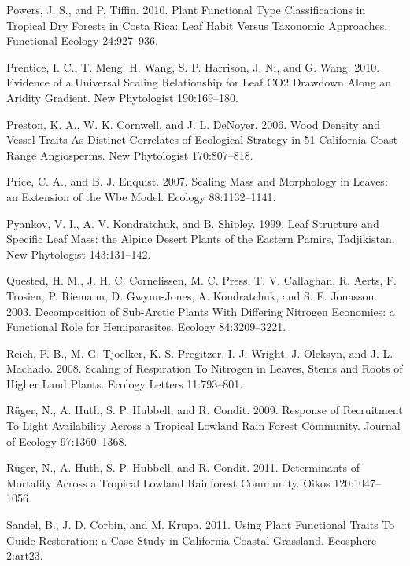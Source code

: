 \documentclass[11pt]{article}
\begin{document}
\begin{hangparas}{1.5em}{1}
\hypertarget{citeproc_bib_item_91}{Powers, J. S., and P. Tiffin. 2010. Plant Functional Type Classifications in Tropical Dry Forests in Costa Rica: Leaf Habit Versus Taxonomic Approaches. Functional Ecology 24:927–936.}

\hypertarget{citeproc_bib_item_92}{Prentice, I. C., T. Meng, H. Wang, S. P. Harrison, J. Ni, and G. Wang. 2010. Evidence of a Universal Scaling Relationship for Leaf CO2 Drawdown Along an Aridity Gradient. New Phytologist 190:169–180.}

\hypertarget{citeproc_bib_item_93}{Preston, K. A., W. K. Cornwell, and J. L. DeNoyer. 2006. Wood Density and Vessel Traits As Distinct Correlates of Ecological Strategy in 51 California Coast Range Angiosperms. New Phytologist 170:807–818.}

\hypertarget{citeproc_bib_item_94}{Price, C. A., and B. J. Enquist. 2007. Scaling Mass and Morphology in Leaves: an Extension of the Wbe Model. Ecology 88:1132–1141.}

\hypertarget{citeproc_bib_item_95}{Pyankov, V. I., A. V. Kondratchuk, and B. Shipley. 1999. Leaf Structure and Specific Leaf Mass: the Alpine Desert Plants of the Eastern Pamirs, Tadjikistan. New Phytologist 143:131–142.}

\hypertarget{citeproc_bib_item_96}{Quested, H. M., J. H. C. Cornelissen, M. C. Press, T. V. Callaghan, R. Aerts, F. Trosien, P. Riemann, D. Gwynn-Jones, A. Kondratchuk, and S. E. Jonasson. 2003. Decomposition of Sub-Arctic Plants With Differing Nitrogen Economies: a Functional Role for Hemiparasites. Ecology 84:3209–3221.}

\hypertarget{citeproc_bib_item_97}{Reich, P. B., M. G. Tjoelker, K. S. Pregitzer, I. J. Wright, J. Oleksyn, and J.-L. Machado. 2008. Scaling of Respiration To Nitrogen in Leaves, Stems and Roots of Higher Land Plants. Ecology Letters 11:793–801.}

\hypertarget{citeproc_bib_item_98}{Rüger, N., A. Huth, S. P. Hubbell, and R. Condit. 2009. Response of Recruitment To Light Availability Across a Tropical Lowland Rain Forest Community. Journal of Ecology 97:1360–1368.}

\hypertarget{citeproc_bib_item_99}{Rüger, N., A. Huth, S. P. Hubbell, and R. Condit. 2011. Determinants of Mortality Across a Tropical Lowland Rainforest Community. Oikos 120:1047–1056.}

\hypertarget{citeproc_bib_item_100}{Sandel, B., J. D. Corbin, and M. Krupa. 2011. Using Plant Functional Traits To Guide Restoration: a Case Study in California Coastal Grassland. Ecosphere 2:art23.}


\end{hangparas}
\end{document}

